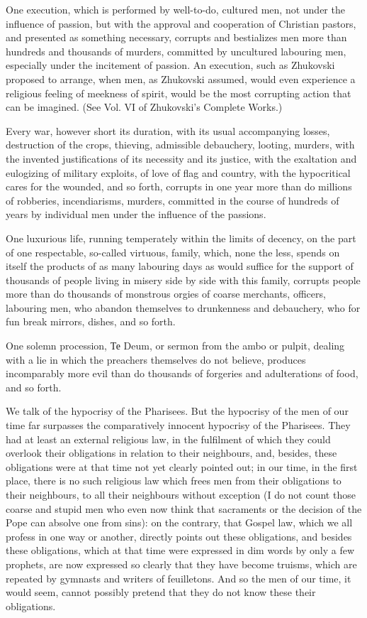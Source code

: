 \documentclass{book}
\begin{document}
One execution, which is performed by well-to-do, cultured men, not under the influence of passion, but with the approval and cooperation of Christian pastors, and presented as something necessary, corrupts and bestializes men more than hundreds and thousands of murders, committed by uncultured labouring men, especially under the incitement of passion. An execution, such as Zhukovski proposed to arrange, when men, as Zhukovski assumed, would even experience a religious feeling of meekness of spirit, would be the most corrupting action that can be imagined. (See Vol. VI of Zhukovski’s Complete Works.)

Every war, however short its duration, with its usual accompanying losses, destruction of the crops, thieving, admissible debauchery, looting, murders, with the invented justifications of its necessity and its justice, with the exaltation and eulogizing of military exploits, of love of flag and country, with the hypocritical cares for the wounded, and so forth, corrupts in one year more than do millions of robberies, incendiarisms, murders, committed in the course of hundreds of years by individual men under the influence of the passions.

One luxurious life, running temperately within the limits of decency, on the part of one respectable, so-called virtuous, family, which, none the less, spends on itself the products of as many labouring days as would suffice for the support of thousands of people living in misery side by side with this family, corrupts people more than do thousands of monstrous orgies of coarse merchants, officers, labouring men, who abandon themselves to drunkenness and debauchery, who for fun break mirrors, dishes, and so forth.

One solemn procession, Те Deum, or sermon from the ambo or pulpit, dealing with a lie in which the preachers themselves do not believe, produces incomparably more evil than do thousands of forgeries and adulterations of food, and so forth.

We talk of the hypocrisy of the Pharisees. But the hypocrisy of the men of our time far surpasses the comparatively innocent hypocrisy of the Pharisees. They had at least an external religious law, in the fulfilment of which they could overlook their obligations in relation to their neighbours, and, besides, these obligations were at that time not yet clearly pointed out; in our time, in the first place, there is no such religious law which frees men from their obligations to their neighbours, to all their neighbours without exception (I do not count those coarse and stupid men who even now think that sacraments or the decision of the Pope can absolve one from sins): on the contrary, that Gospel law, which we all profess in one way or another, directly points out these obligations, and besides these obligations, which at that time were expressed in dim words by only a few prophets, are now expressed so clearly that they have become truisms, which are repeated by gymnasts and writers of feuilletons. And so the men of our time, it would seem, cannot possibly pretend that they do not know these their obligations.
\end{document}

